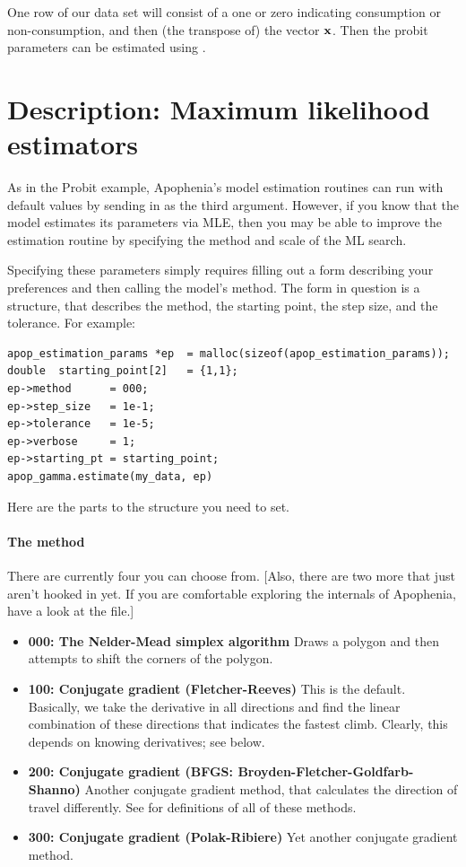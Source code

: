 One row of our data set will consist of a one or zero indicating
consumption or non-consumption, and then (the transpose of) the vector
${\bf x}$. Then the probit parameters can be estimated using
.

\section{Description: Maximum likelihood estimators} 
As in the Probit example, Apophenia's model estimation routines can run
with default values by sending in  as the third
argument. However, if you know that the model estimates its parameters
via MLE, then you may be able to improve the estimation routine by
specifying the method and scale of the ML search.

Specifying these parameters simply requires 
filling out a form describing your preferences and then calling the model's  method.
The form in question is a  structure, that
describes the method, the starting point, the step size, and the
tolerance.
For example:
\begin{lstlisting}
apop_estimation_params *ep  = malloc(sizeof(apop_estimation_params));
double  starting_point[2]   = {1,1};
ep->method      = 000;
ep->step_size   = 1e-1;
ep->tolerance   = 1e-5;
ep->verbose     = 1;
ep->starting_pt = starting_point;
apop_gamma.estimate(my_data, ep)
\end{lstlisting}

Here are the parts to the  
structure you need to set. 

\paragraph{The method} There are currently four you can choose from.
[Also, there are two more that  just aren't hooked in yet. If you are
comfortable exploring the internals of Apophenia, have a look at the
 file.]


\begin{itemize}
\item {\bf 000: The Nelder-Mead simplex algorithm} Draws a polygon and then attempts to shift the corners of the polygon.
\item {\bf 100: Conjugate gradient (Fletcher-Reeves)} This is the
default. Basically, we take the derivative in all directions and find
the linear combination of these directions that indicates the fastest
climb. Clearly, this depends on knowing derivatives; see below.
\item {\bf 200: Conjugate gradient (BFGS: Broyden-Fletcher-Goldfarb-Shanno)}  Another conjugate gradient method, that calculates the direction of travel differently. See \cite{avriel:nonlinear} for definitions of all of these methods.
\item {\bf 300: Conjugate gradient (Polak-Ribiere)} Yet another conjugate gradient method.
\end{itemize}

